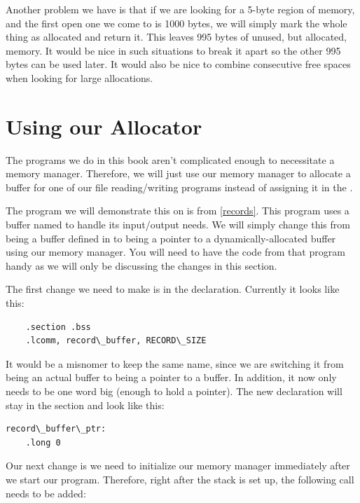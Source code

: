 Another problem we have is that if we are looking for a 5-byte region of memory, and
the first open one we come to is 1000 bytes, we will simply mark the whole thing
as allocated and return it.  This leaves 995 bytes of unused, but allocated, memory.
It would be nice in such situations to break it apart so the other 995 bytes can be
used later.  It would also be nice to combine consecutive free spaces when looking
for large allocations.

\section{Using our Allocator}

The programs we do in this book aren't complicated enough to necessitate a memory
manager.  Therefore, we will just use our memory manager to allocate a buffer
for one of our file reading/writing programs instead of assigning it in the 
.

The program we will demonstrate this on is  from
\autoref{records}.  This program uses a buffer named 
to handle its input/output needs.  We will simply change this from being a buffer defined
in  to being a pointer to a dynamically-allocated buffer using
our memory manager.  You will need to have the code from that program handy as we will
only be discussing the changes in this section.

The first change we need to make is in the declaration.  Currently it looks like this:

\begin{simpletyping}
\begin{lstlisting}
	.section .bss
	.lcomm, record\_buffer, RECORD\_SIZE
\end{lstlisting}
\end{simpletyping}

It would be a misnomer to keep the same name, since we are switching it from being an
actual buffer to being a pointer to a buffer.  In addition, it now only needs to be
one word big (enough to hold a pointer).  The new declaration will stay in the 
 section and look like this:

\begin{simpletyping}
\begin{lstlisting}
record\_buffer\_ptr:
	.long 0
\end{lstlisting}
\end{simpletyping}

Our next change is we need to initialize our memory manager immediately after 
we start our program.  Therefore, right after the stack is set up, the following
call needs to be added:

